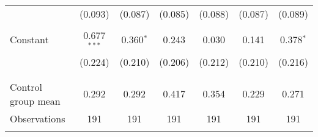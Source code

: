 \begin{tabular}{@{\extracolsep{5pt}}lcccccc}
  & (0.093) & (0.087) & (0.085) & (0.088) & (0.087) & (0.089) \\ 
  & & & & & & \\ 
 Constant & 0.677$^{***}$ & 0.360$^{*}$ & 0.243 & 0.030 & 0.141 & 0.378$^{*}$ \\ 
  & (0.224) & (0.210) & (0.206) & (0.212) & (0.210) & (0.216) \\ 
  & & & & & & \\ 
\hline \\[-1.8ex] 
Control group mean & 0.292 & 0.292 & 0.417 & 0.354 & 0.229 & 0.271 \\ 
Observations & 191 & 191 & 191 & 191 & 191 & 191 \\ 
\hline 
\hline \\[-1.8ex] 
\end{tabular} 
